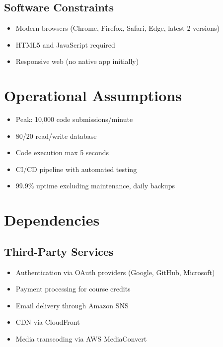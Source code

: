 \documentclass[a4paper, 11pt]{scrreprt}
\begin{document}
\subsection{Software Constraints}
\begin{itemize}
    \item Modern browsers (Chrome, Firefox, Safari, Edge, latest 2 versions)
    \item HTML5 and JavaScript required
    \item Responsive web (no native app initially)
\end{itemize}

\section{Operational Assumptions}
\begin{itemize}
    \item Peak: 10,000 code submissions/minute
    \item 80/20 read/write database
    \item Code execution max 5 seconds
    \item CI/CD pipeline with automated testing
    \item 99.9\% uptime excluding maintenance, daily backups
\end{itemize}

\section{Dependencies}
\subsection{Third-Party Services}
\begin{itemize}
    \item Authentication via OAuth providers (Google, GitHub, Microsoft)
    \item Payment processing for course credits
    \item Email delivery through Amazon SNS
    \item CDN via CloudFront
    \item Media transcoding via AWS MediaConvert
\end{itemize}
\end{document}
